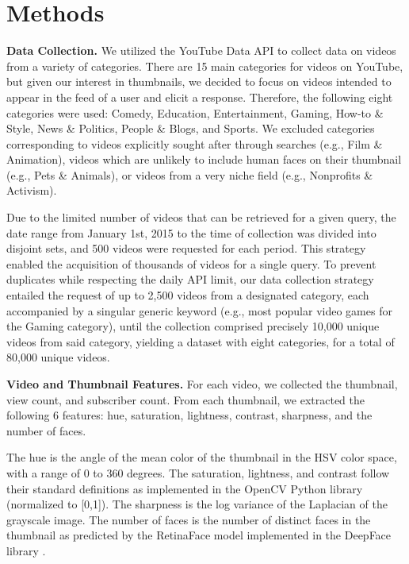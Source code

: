 \documentclass{article}
\begin{document}
\section{Methods}
\textbf{Data Collection.} We utilized the YouTube Data API \cite{youtubeapi} to collect data on videos from a variety of categories. There are 15 main categories for videos on YouTube, but given our interest in thumbnails, we decided to focus on videos intended to appear in the feed of a user and elicit a response. Therefore, the following eight categories were used: Comedy, Education, Entertainment, Gaming, How-to \& Style, News \& Politics, People \& Blogs, and Sports. We excluded categories corresponding to videos explicitly sought after through searches (e.g., Film \& Animation), videos which are unlikely to include human faces on their thumbnail (e.g., Pets \& Animals), or videos from a very niche field (e.g., Nonprofits \& Activism).

Due to the limited number of videos that can be retrieved for a given query, the date range from January 1st, 2015 to the time of collection was divided into disjoint sets, and 500 videos were requested for each period. This strategy enabled the acquisition of thousands of videos for a single query. To prevent duplicates while respecting the daily API limit, our data collection strategy entailed the request of up to 2,500 videos from a designated category, each accompanied by a singular generic keyword (e.g., most popular video games for the Gaming category), until the collection comprised precisely 10,000 unique videos from said category, yielding a dataset with eight categories, for a total of 80,000 unique videos.



\textbf{Video and Thumbnail Features.} For each video, we collected the thumbnail, view count, and subscriber count. From each thumbnail, we extracted the following 6 features: hue, saturation, lightness, contrast, sharpness, and the number of faces.

The hue is the angle of the mean color of the thumbnail in the HSV color space, with a range of 0 to 360 degrees. The saturation, lightness, and contrast follow their standard definitions as implemented in the OpenCV Python library (normalized to [0,1]). The sharpness is the log variance of the Laplacian of the grayscale image. The number of faces is the number of distinct faces in the thumbnail as predicted by the RetinaFace model implemented in the DeepFace library \cite{serengil2024lightface,serengil2020lightface}.
\end{document}
